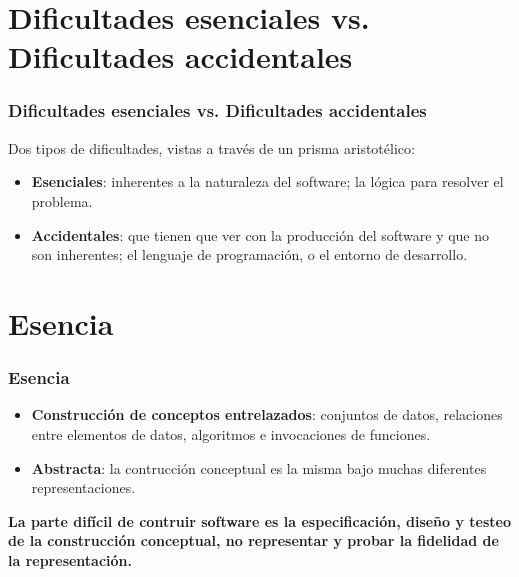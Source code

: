 \documentclass{beamer}
\begin{document}
\section{Dificultades esenciales vs. Dificultades accidentales}
\begin{frame}
\frametitle{Dificultades esenciales vs. Dificultades accidentales}

Dos tipos de dificultades, vistas a través de un prisma aristotélico:\\
	\begin{itemize}
		\item \textbf{Esenciales}: inherentes a la naturaleza del software; la lógica para resolver el problema.
		\item \textbf{Accidentales}: que tienen que ver con la producción del software y que no son inherentes; el lenguaje  de programación, o el entorno de desarrollo.	
	\end{itemize}
\end{frame}

\section{Esencia}
\begin{frame}
\frametitle{Esencia}

	\begin{itemize}
		\item \textbf{Construcción de conceptos entrelazados}: conjuntos de datos, relaciones entre elementos de datos, algoritmos e invocaciones de funciones.
		\item \textbf{Abstracta}: la contrucción conceptual es la misma bajo muchas diferentes representaciones.				
	\end{itemize}

\textbf{La parte difícil de contruir software es la especificación, diseño y testeo de la construcción conceptual, no representar y probar la fidelidad de la representación.}
\end{frame}
\end{document}
